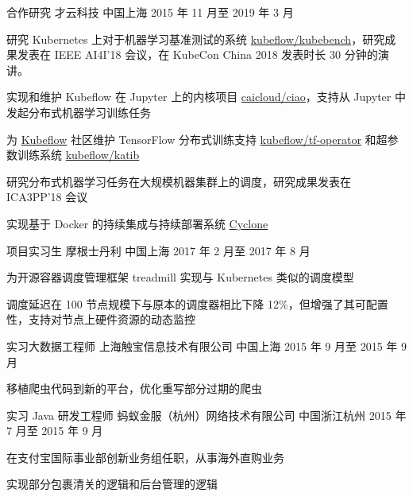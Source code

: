 \begin{cventries}
  \cventry
    {合作研究} %
    {才云科技} %
    {中国上海} %
    {2015 年 11 月至 2019 年 3 月} %
    {
      \begin{cvitems} %
        \item 研究 Kubernetes 上对于机器学习基准测试的系统 \href{https://github.com/kubeflow/kubebench}{kubeflow/kubebench}，研究成果发表在 IEEE AI4I'18 会议，在 KubeCon China 2018 发表时长 30 分钟的演讲。
        \item 实现和维护 Kubeflow 在 Jupyter 上的内核项目 \href{https://github.com/caicloud/ciao}{caicloud/ciao}，支持从 Jupyter 中发起分布式机器学习训练任务
        \item 为 \href{https://github.com/kubeflow/kubeflow}{Kubeflow} 社区维护 TensorFlow 分布式训练支持 \href{https://github.com/kubeflow/tf-operator}{kubeflow/tf-operator} 和超参数训练系统 \href{https://github.com/kubeflow/katib}{kubeflow/katib}
        \item 研究分布式机器学习任务在大规模机器集群上的调度，研究成果发表在 ICA3PP'18 会议
        \item 实现基于 Docker 的持续集成与持续部署系统 \href{https://github.com/caicloud/cyclone}{Cyclone}
      \end{cvitems}
    }

  \cventry
    {项目实习生} %
    {摩根士丹利} %
    {中国上海} %
    {2017 年 2 月至 2017 年 8 月} %
    {
      \begin{cvitems} %
        \item 为开源容器调度管理框架 treadmill 实现与 Kubernetes 类似的调度模型
        \item 调度延迟在 100 节点规模下与原本的调度器相比下降 12\%，但增强了其可配置性，支持对节点上硬件资源的动态监控
      \end{cvitems}
    }

  \cventry
    {实习大数据工程师} %
    {上海触宝信息技术有限公司} %
    {中国上海} %
    {2015 年 9 月至 2015 年 9 月} %
    {
      \begin{cvitems} %
        \item 移植爬虫代码到新的平台，优化重写部分过期的爬虫
      \end{cvitems}
    }

  \cventry
    {实习 Java 研发工程师} %
    {蚂蚁金服（杭州）网络技术有限公司} %
    {中国浙江杭州} %
    {2015 年 7 月至 2015 年 9 月} %
    {
      \begin{cvitems} %
        \item 在支付宝国际事业部创新业务组任职，从事海外直购业务
        \item 实现部分包裹清关的逻辑和后台管理的逻辑
      \end{cvitems}
    }

\end{cventries}
